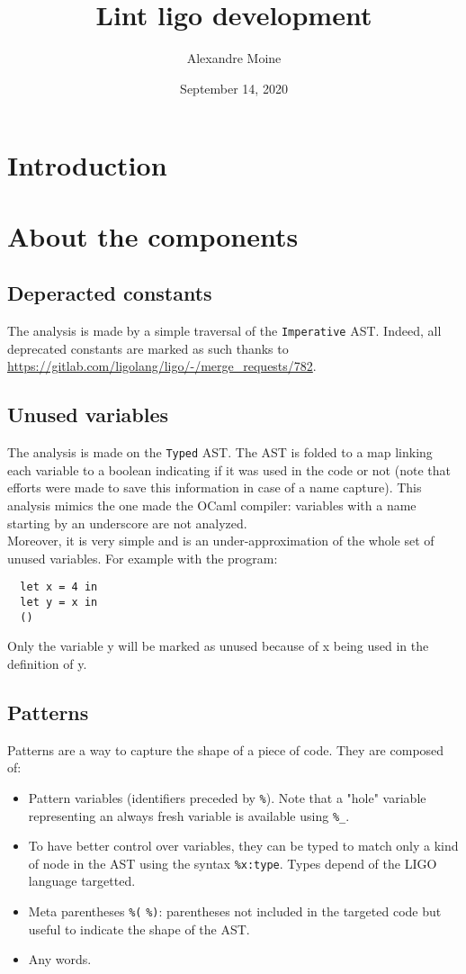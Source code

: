 \documentclass[10pt,a4paper]{article}
\author{Alexandre Moine}
\title{Lint ligo development}
\date{September 14, 2020}
\begin{document}
\maketitle

\section{Introduction}



\section{About the components}

\subsection{Deperacted constants}

The analysis is made by a simple traversal of the \verb|Imperative| AST. Indeed, all deprecated constants are marked as such thanks to \url{https://gitlab.com/ligolang/ligo/-/merge_requests/782}.

\subsection{Unused variables}

The analysis is made on the \verb|Typed| AST. The AST is folded to a map linking each variable to a boolean indicating if it was used in the code or not (note that efforts were made to save this information in case of a name capture).
This analysis mimics the one made the OCaml compiler: variables with a name starting by an underscore are not analyzed.\\
Moreover, it is very simple and is an under-approximation of the whole set of unused variables.
For example with the program:
\begin{verbatim}
  let x = 4 in
  let y = x in
  ()
\end{verbatim}
Only the variable y will be marked as unused because of x being used in the definition of y.

\subsection{Patterns}
Patterns are a way to capture the shape of a piece of code. They are composed of:

\begin{itemize}
\item Pattern variables (identifiers preceded by \verb|%|). Note that a "hole" variable representing an always fresh variable is available using \verb|%_|.
\item To have better control over variables, they can be typed to match only a kind of node in the AST using the syntax \verb|%x:type|. Types depend of the LIGO language targetted.
\item Meta parentheses \verb|%(| \verb|%)|: parentheses not included in the targeted code but useful to indicate the shape of the AST.
\item Any words.
\end{itemize}
\end{document}
